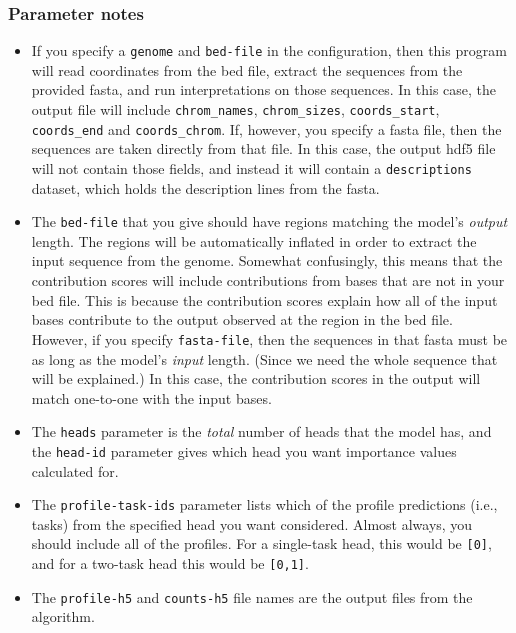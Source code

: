 \documentclass{article}
\begin{document}
\subsubsection{Parameter notes}
\begin{itemize}
    \item If you specify a \texttt{genome} and \texttt{bed-file} in the configuration, then
        this program will read coordinates from the bed file, extract the sequences from the
        provided fasta, and run interpretations on those sequences. In this case, the output file
        will include \texttt{chrom\_names}, \texttt{chrom\_sizes}, \texttt{coords\_start}, 
        \texttt{coords\_end} and \texttt{coords\_chrom}. If, however, you specify a fasta file,
        then the sequences are taken directly from that file. In this case, the output
        hdf5 file will not contain those fields, and instead it will contain a
        \texttt{descriptions} dataset, which holds the description lines from the fasta.
    \item The \texttt{bed-file} that you give should have regions matching the model's
        \emph{output} length. The regions will be automatically inflated in order to
        extract the input sequence from the genome. Somewhat confusingly, this means
        that the contribution scores will include contributions from bases that are not
        in your bed file. This is because the contribution scores explain how all of the
        input bases contribute to the output observed at the region in the bed file.
        However, if you specify \texttt{fasta-file}, then the sequences in that fasta
        must be as long as the model's \emph{input} length.
        (Since we need the whole sequence that will be explained.) In this case,
        the contribution scores in the output will match one-to-one with the input bases.

    \item The \texttt{heads} parameter is the \emph{total} number of heads that the model has,
        and the \texttt{head-id} parameter gives which head you want importance values calculated
        for.
    \item The \texttt{profile-task-ids} parameter lists which of the profile predictions
        (i.e., tasks) from the specified head you want considered.
        Almost always, you should include all of the profiles. For a single-task head, this
        would be \texttt{[0]}, and for a two-task head this would be \texttt{[0,1]}.
    \item The \texttt{profile-h5} and \texttt{counts-h5} file names are the output files from
        the algorithm.
\end{itemize}
\end{document}
